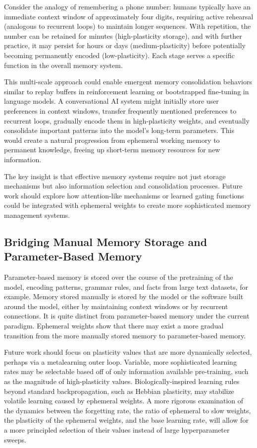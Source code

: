 \documentclass[conference]{IEEEtran}
\begin{document}
Consider the analogy of remembering a phone number: humans typically have an immediate context window of approximately four digits, requiring active rehearsal (analogous to recurrent loops) to maintain longer sequences. With repetition, the number can be retained for minutes (high-plasticity storage), and with further practice, it may persist for hours or days (medium-plasticity) before potentially becoming permanently encoded (low-plasticity). Each stage serves a specific function in the overall memory system.

This multi-scale approach could enable emergent memory consolidation behaviors similar to replay buffers in reinforcement learning or bootstrapped fine-tuning in language models. A conversational AI system might initially store user preferences in context windows, transfer frequently mentioned preferences to recurrent loops, gradually encode them in high-plasticity weights, and eventually consolidate important patterns into the model's long-term parameters. This would create a natural progression from ephemeral working memory to permanent knowledge, freeing up short-term memory resources for new information.

The key insight is that effective memory systems require not just storage mechanisms but also information selection and consolidation processes. Future work should explore how attention-like mechanisms or learned gating functions could be integrated with ephemeral weights to create more sophisticated memory management systems.

\subsection{Bridging Manual Memory Storage and Parameter-Based Memory}

Parameter-based memory is stored over the course of the pretraining of the model, encoding patterns, grammar rules, and facts from large text datasets, for example. Memory stored manually is stored by the model or the software built around the model, either by maintaining context windows or by recurrent connections. It is quite distinct from parameter-based memory under the current paradigm. Ephemeral weights show that there may exist a more gradual transition from the more manually stored memory to parameter-based memory. 

Future work should focus on plasticity values that are more dynamically selected, perhaps via a metalearning outer loop. Variable, more sophisticated learning rates may be selectable based off of only information available pre-training, such as the magnitude of high-plasticity values. Biologically-inspired learning rules beyond standard backpropagation, such as Hebbian plasticity, may stabilize volatile learning caused by ephemeral weights. A more rigorous examination of the dynamics between the forgetting rate, the ratio of ephemeral to slow weights, the plasticity of the ephemeral weights, and the base learning rate, will allow for a more principled selection of their values instead of large hyperparameter sweeps.
\end{document}
